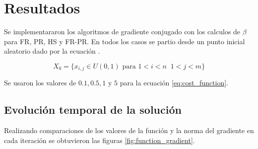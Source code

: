 \section{Resultados}

Se implementararon los algoritmos de gradiente conjugado con los calculos de $\beta$ para FR, PR, HS y FR-PR. En todos los casos se partio desde un punto inicial aleatorio dado por la ecuación .

\begin{equation*}
    X_0 = \{x_{i,j} \in \mathit{U}(0,1) \text{ para } 1<i<n\;\; 1<j<m\}
\end{equation*}

Se usaron los valores de $0.1, 0.5, 1$ y $5$ para la ecuación \ref{eq:cost_function}.

\subsection{Evolución temporal de la solución}

Realizando comparaciones de los valores de la función y la norma del gradiente en cada iteración se obtuvieron las figuras \ref{fig:function_gradient}.

